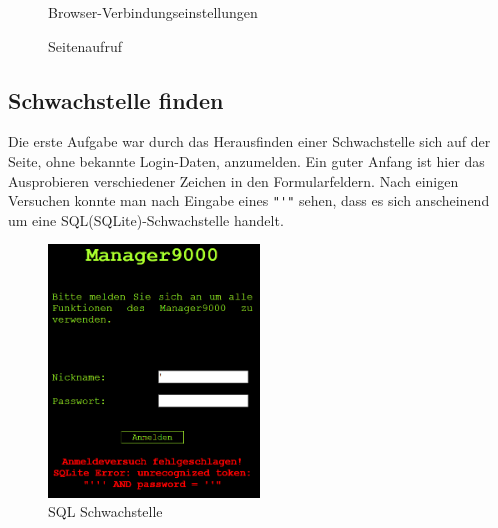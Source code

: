 \documentclass[12pt,a4paper,titlepage,oneside]{scrartcl}
\begin{document}
\begin{figure}[h!]
  \centering
  \caption{Browser-Verbindungseinstellungen}
  \label{fig:proxy}
\end{figure}

\begin{figure}[h!]
  \centering
  \caption{Seitenaufruf}
  \label{fig:enterSite}
\end{figure}

\pagebreak

\subsection{Schwachstelle finden}

Die erste Aufgabe war durch das Herausfinden einer Schwachstelle sich auf der Seite, ohne bekannte Login-Daten, anzumelden.
Ein guter Anfang ist hier das Ausprobieren verschiedener Zeichen in den Formularfeldern. Nach einigen Versuchen konnte man nach Eingabe eines \lstinline{"'"} sehen, dass es sich anscheinend um eine SQL(SQLite)-Schwachstelle handelt.

\begin{figure}[h!]
  \centering
    \includegraphics[width=0.5\textwidth]{./imgs/manager9000/m9000_sql_error1.png}
  \caption{SQL Schwachstelle}
  \label{fig:sql_weakness}
\end{figure}
\end{document}
